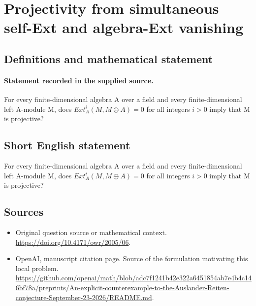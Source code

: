 \documentclass[11pt]{article}
\begin{document}
\section*{Projectivity from simultaneous self-Ext and algebra-Ext vanishing}\label{30006991}
\subsection{Definitions and mathematical statement}
\paragraph{Statement recorded in the supplied source.}
For every finite-dimensional algebra A over a field and every finite-dimensional left A-module M, does $Ext_A^i(M,M\oplus A)=0$ for all integers $i>0$ imply that M is projective?
\subsection{Short English statement}
For every finite-dimensional algebra A over a field and every finite-dimensional left A-module M, does $Ext_A^i(M,M\oplus A)=0$ for all integers $i>0$ imply that M is projective?
\subsection{Sources}
\begin{itemize}
\item[S1] Original question source or mathematical context.
\url{https://doi.org/10.4171/owr/2005/06}.
\item[S2] OpenAI, manuscript citation page. Source of the formulation motivating this local problem.
\url{https://github.com/openai/math/blob/adc7f1241b42e322a6451854ab7e4b4c146bf78a/preprints/An-explicit-counterexample-to-the-Auslander-Reiten-conjecture-September-23-2026/README.md}.
\end{itemize}
\end{document}

